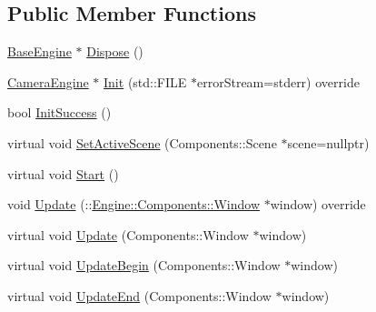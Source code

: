\subsection*{Public Member Functions}
\begin{DoxyCompactItemize}
\item 
\mbox{\hyperlink{classEngine_1_1BaseEngine_ad838c97afe1790cb35527f0b58e81e6b}{Base\+Engine}} $\ast$ \mbox{\hyperlink{classEngine_1_1BaseEngine_acd5cd5d2189d24e038b23477b7dce405}{Dispose}} ()
\item 
\mbox{\hyperlink{classApplication_1_1Engines_1_1CameraEngine}{Camera\+Engine}} $\ast$ \mbox{\hyperlink{classApplication_1_1Engines_1_1CameraEngine_a0c7723b93afbdef70394961a4624813d}{Init}} (std\+::\+F\+I\+LE $\ast$error\+Stream=stderr) override
\item 
bool \mbox{\hyperlink{classEngine_1_1BaseEngine_a7a1c9b833049b3eb61194cab113dfe89}{Init\+Success}} ()
\item 
virtual void \mbox{\hyperlink{classEngine_1_1BaseEngine_afc82c6a00d5a9d4714740fc5eab5db86}{Set\+Active\+Scene}} (Components\+::\+Scene $\ast$scene=nullptr)
\item 
virtual void \mbox{\hyperlink{classEngine_1_1BaseEngine_a525fdc7a1da7eecb514ad5763f06be79}{Start}} ()
\item 
void \mbox{\hyperlink{classApplication_1_1Engines_1_1CameraEngine_a48f10aa5b7d87545f5c04d69c37df665}{Update}} (\+::\mbox{\hyperlink{classEngine_1_1Components_1_1Window}{Engine\+::\+Components\+::\+Window}} $\ast$window) override
\item 
virtual void \mbox{\hyperlink{classEngine_1_1BaseEngine_a01c23c2073f08939a660f3b7a866852c}{Update}} (Components\+::\+Window $\ast$window)
\item 
virtual void \mbox{\hyperlink{classEngine_1_1BaseEngine_aace6be2a42d12b64fbd35f1acdb08408}{Update\+Begin}} (Components\+::\+Window $\ast$window)
\item 
virtual void \mbox{\hyperlink{classEngine_1_1BaseEngine_a7c07c98e583df042a0eb01e0ddec85a1}{Update\+End}} (Components\+::\+Window $\ast$window)
\end{DoxyCompactItemize}
